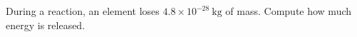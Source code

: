 During a reaction, an element loses $4.8 \times 10^{-28} \ \mathrm{kg}$ of mass. 
Compute how much energy is released.